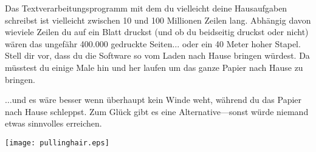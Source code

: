 Das Textverarbeitungsprogramm mit dem du vielleicht deine Hausaufgaben schreibst ist vielleicht zwischen 10 und 100 Millionen Zeilen lang. Abhängig davon wieviele Zeilen du auf ein Blatt druckst (und ob du beidseitig druckst oder nicht) wären das ungefähr 400.000 gedruckte Seiten$\ldots$ oder ein 40 Meter hoher Stapel.
Stell dir vor, dass du die Software so vom Laden nach Hause bringen würdest. Da müsstest du einige Male hin und her laufen um das ganze Papier nach Hause zu bringen.

$\ldots$und es wäre besser wenn überhaupt kein Winde weht, während du das Papier nach Hause schleppst. Zum Glück gibt es eine Alternative---sonst würde niemand etwas sinnvolles erreichen.


\begin{center}
\texttt{[image: pullinghair.eps]}
\end{center}

